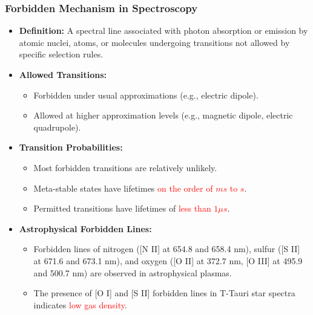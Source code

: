 \documentclass{beamer}		%
\begin{document}
\begin{frame}
    \frametitle{Forbidden Mechanism in Spectroscopy}

    \begin{itemize}
        \item \textbf{Definition:} A spectral line associated with photon absorption or emission by atomic nuclei, atoms, or molecules undergoing transitions not allowed by specific selection rules.
        
        \item \textbf{Allowed Transitions:}
            \begin{itemize}
                \item Forbidden under usual approximations (e.g., electric dipole).
                \item Allowed at higher approximation levels (e.g., magnetic dipole, electric quadrupole).
            \end{itemize}
        
        \item \textbf{Transition Probabilities:}
            \begin{itemize}
                \item Most forbidden transitions are relatively unlikely.
                \item Meta-stable states have lifetimes \textcolor{red}{on the order of $ms$ to $s$}.
                \item Permitted transitions have lifetimes of \textcolor{red}{less than $1\mu s$}.
            \end{itemize}
        
        \item \textbf{Astrophysical Forbidden Lines:}
            \begin{itemize}
                \item Forbidden lines of nitrogen ([N II] at 654.8 and 658.4 nm), sulfur ([S II] at 671.6 and 673.1 nm), and oxygen ([O II] at 372.7 nm, [O III] at 495.9 and 500.7 nm) are observed in astrophysical plasmas.
                \item The presence of [O I] and [S II] forbidden lines in T-Tauri star spectra indicates \textcolor{red}{low gas density}.
            \end{itemize}
    \end{itemize}
\end{frame}
    
\end{document}
